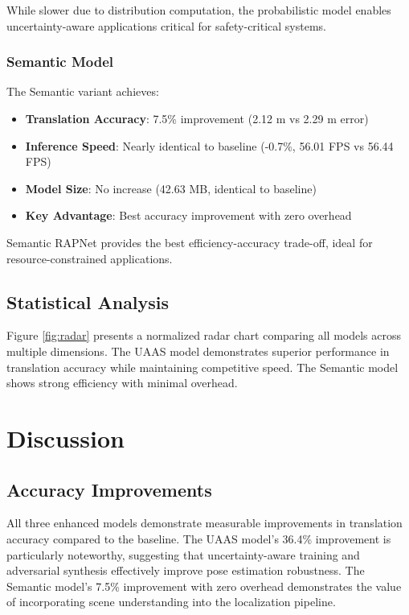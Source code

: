 \documentclass[conference]{IEEEtran}
\begin{document}
While slower due to distribution computation, the probabilistic model enables uncertainty-aware applications critical for safety-critical systems.

\subsubsection{Semantic Model}
The Semantic variant achieves:
\begin{itemize}
    \item \textbf{Translation Accuracy}: 7.5\% improvement (2.12 m vs 2.29 m error)
    \item \textbf{Inference Speed}: Nearly identical to baseline (-0.7\%, 56.01 FPS vs 56.44 FPS)
    \item \textbf{Model Size}: No increase (42.63 MB, identical to baseline)
    \item \textbf{Key Advantage}: Best accuracy improvement with zero overhead
\end{itemize}

Semantic RAPNet provides the best efficiency-accuracy trade-off, ideal for resource-constrained applications.

\subsection{Statistical Analysis}

Figure \ref{fig:radar} presents a normalized radar chart comparing all models across multiple dimensions. The UAAS model demonstrates superior performance in translation accuracy while maintaining competitive speed. The Semantic model shows strong efficiency with minimal overhead.

\section{Discussion}

\subsection{Accuracy Improvements}

All three enhanced models demonstrate measurable improvements in translation accuracy compared to the baseline. The UAAS model's 36.4\% improvement is particularly noteworthy, suggesting that uncertainty-aware training and adversarial synthesis effectively improve pose estimation robustness. The Semantic model's 7.5\% improvement with zero overhead demonstrates the value of incorporating scene understanding into the localization pipeline.
\end{document}
